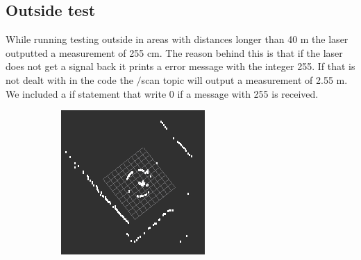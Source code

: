 \subsection{Outside test}
While running testing outside in areas with distances longer than 40 m the laser outputted a measurement of 255 cm. The reason behind this is that if the laser does not get a signal back it prints a error message with the integer 255. If that is not dealt with in the code the $/$scan topic will output a measurement of 2.55 m. We included a if statement that write 0 if a message with 255 is received. 

\begin{figure}[H]
	\centering
	\begin{subfigure}[H]{0.45\textwidth}
		\includegraphics[width=\textwidth]{images/outside_error.png}
		\label{}
	\end{subfigure}%
	\quad
	\begin{subfigure}[H]{0.5\textwidth}

\end{subfigure}
\end{figure}
